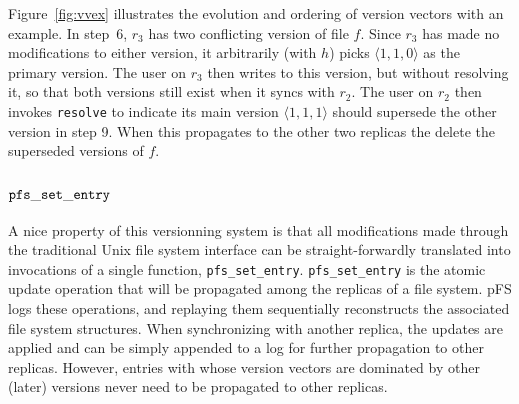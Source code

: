 Figure~\ref{fig:vvex} illustrates the evolution and ordering of
version vectors with an example.  In step~6, $r_3$ has two conflicting
version of file $f$.  Since $r_3$ has made no modifications to either
version, it arbitrarily (with $h$) picks $\langle 1,1,0\rangle$ as the
primary version.  The user on $r_3$ then writes to this version, but
without resolving it, so that both versions still exist when it syncs
with $r_2$.  The user on $r_2$ then invokes \texttt{resolve} to
indicate its main version $\langle 1, 1, 1\rangle$ should supersede
the other version in step 9.  When this propagates to the other two
replicas the delete the superseded versions of $f$.



\subsection {${\tt pfs\_set\_entry}$}
\label{sec:pfssetentry}

A nice property of this versionning system is that all modifications
made through the traditional Unix file system interface can be
straight-forwardly translated into invocations of a single function,
{\tt pfs\_set\_entry}.  {\tt pfs\_set\_entry} is the atomic update
operation that will be propagated among the replicas of a file system.
pFS logs these operations, and replaying them sequentially
reconstructs the associated file system structures.  When
synchronizing with another replica, the updates are applied and can be
simply appended to a log for further propagation to other replicas.
However, entries with whose version vectors are dominated by other
(later) versions never need to be propagated to other replicas.

